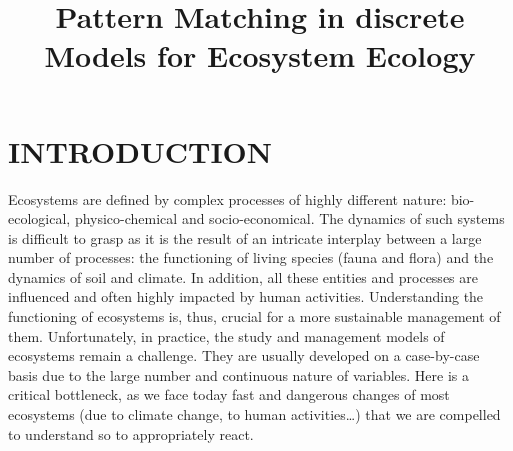\documentclass[a4paper,twoside]{article}
\begin{document}
%
\title{Pattern Matching in discrete Models for Ecosystem Ecology}

\author{
}




\onecolumn \maketitle \normalsize \vfill

\section{\uppercase{Introduction} }

Ecosystems are defined by complex processes of highly different nature: \eg bio-ecological, physico-chemical and socio-economical. 
The dynamics of such systems is difficult to grasp as it is the result of an intricate interplay between a large number of processes: the functioning of living species (fauna and flora) and the dynamics of soil and climate. 
In addition, all these entities and processes are influenced and often highly impacted by human activities. 
%
Understanding the functioning of ecosystems is, thus, crucial for a more sustainable management of them. 
Unfortunately, in practice, the study and management models of ecosystems remain a challenge. 
They are usually developed on a case-by-case basis due to the large number and continuous nature of variables. 
Here is a critical bottleneck, as we face today fast and dangerous changes of most ecosystems (due to climate change, to human activities\ldots ) that we are compelled to understand so to appropriately react.
\end{document}
